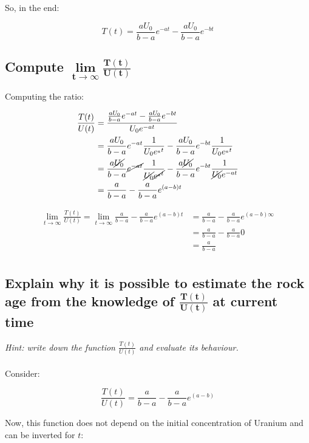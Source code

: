   So, in the end:

  $$T(t) = \frac{aU_0}{b-a}e^{-at} - \frac{aU_0}{b-a}e^{-bt}$$

  \subsection{Compute $\mathbf{\lim\limits_{t \to \infty} \frac{T(t)}{U(t)}}$}

  Computing the ratio:

  \begin{align*}
     \frac{T(t)}{U(t)} &= \frac{\frac{aU_0}{b-a}e^{-at} - \frac{aU_0}{b-a}e^{-bt}}{U_0e^{-at}}\\
                       &= \frac{aU_0}{b-a}e^{-at}\frac{1}{U_0e^{_at}} - \frac{aU_0}{b-a}e^{-bt}\frac{1}{U_0e^{_at}}\\
                       &= \frac{a\cancel{U_0}}{b-a}\cancel{e^{-at}}\frac{1}{\cancel{U_0}\cancel{e^{_at}}} - \frac{a\cancel{U_0}}{b-a}e^{-bt}\frac{1}{\cancel{U_0}e^{-at}}\\
                       &= \frac{a}{b-a} - \frac{a}{b-a}e^{(a-b)t}
   \end{align*}


  \begin{align*}
    \lim\limits_{t \to \infty} \frac{T(t)}{U(t)} = \lim\limits_{t\to\infty} \frac{a}{b-a} - \frac{a}{b-a}e^{(a-b)t} &= \frac{a}{b-a} - \frac{a}{b-a}e^{(a-b)\infty}\\
                                          &= \frac{a}{b-a} - \frac{a}{b-a}0\\
                                          &= \frac{a}{b-a}\\
  \end{align*}

  \subsection{Explain why it is possible to estimate the rock age from the knowledge of $\mathbf{\frac{T(t)}{U(t)}}$ at current time}
  \textit{Hint: write down the function $\frac{T(t)}{U(t)}$ and evaluate its behaviour.}
  \\
  \\
  Consider:

  $$\frac{T(t)}{U(t)} = \frac{a}{b-a} - \frac{a}{b-a}e^{(a-b)}$$

  Now, this function does not depend on the initial concentration of Uranium and can be inverted for $t$:

